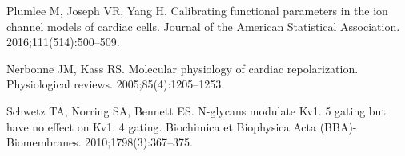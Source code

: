 \documentclass[10pt,letterpaper]{article}
\begin{document}
\begin{thebibliography}{10}
    Plumlee M, Joseph VR, Yang H.
    \newblock Calibrating functional parameters in the ion channel models of
    cardiac cells.
    \newblock Journal of the American Statistical Association.
    2016;111(514):500--509.
    
    Nerbonne JM, Kass RS.
    \newblock Molecular physiology of cardiac repolarization.
    \newblock Physiological reviews. 2005;85(4):1205--1253.
    
    Schwetz TA, Norring SA, Bennett ES.
    \newblock N-glycans modulate Kv1. 5 gating but have no effect on Kv1. 4 gating.
    \newblock Biochimica et Biophysica Acta (BBA)-Biomembranes.
    2010;1798(3):367--375.
\end{thebibliography}
    
\end{document}
